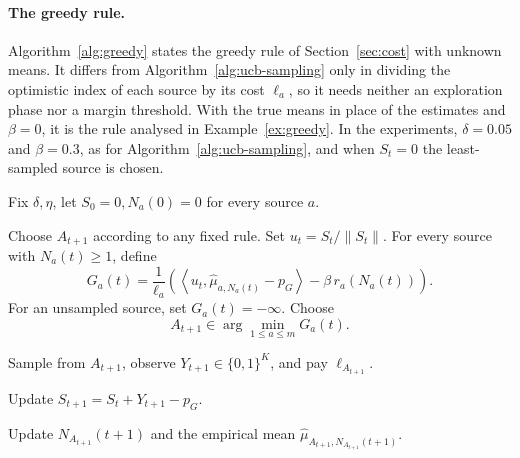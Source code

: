 \documentclass[twoside]{article}
\begin{document}
\paragraph{The greedy rule.} Algorithm~\ref{alg:greedy} states the greedy
rule of Section~\ref{sec:cost} with unknown means. It differs from
Algorithm~\ref{alg:ucb-sampling} only in dividing the optimistic index of
each source by its cost \(\ell_a\), so it needs neither an exploration phase
nor a margin threshold. With the true means in place of the estimates and
\(\beta=0\), it is the rule analysed in Example~\ref{ex:greedy}. In the
experiments, \(\delta=0.05\) and \(\beta=0.3\), as for
Algorithm~\ref{alg:ucb-sampling}, and when \(S_t=0\) the least-sampled
source is chosen.

\begin{algorithm}[!ht]
\caption{Greedy Cost-Aware Sampling}
\label{alg:greedy}
\begin{algorithmic}[1]
\STATE Fix $\delta, \eta$, let \(S_0=0, N_a(0)=0\) for every source \(a\).

        \STATE Choose \(A_{t+1}\) according to any fixed rule.
    \ELSE
        \STATE Set $u_t= S_t/\|S_t\|$.
        \STATE For every source with \(N_a(t)\ge1\), define
        \[
            G_a(t)
                =
                \frac{1}{\ell_a}
                \left(
                \left\langle
                u_t,\widehat\mu_{a,N_a(t)}-p_G
                \right\rangle
                -
                \beta\,r_a\!\left(N_a(t)\right)
                \right).
        \]
        For an unsampled source, set \(G_a(t)=-\infty\).
        \STATE Choose
        \[
            A_{t+1}
            \in
            \arg\min_{1\le a\le m} G_a(t).
        \]
    \ENDIF

    \STATE Sample from \(A_{t+1}\), observe
    \(Y_{t+1}\in\{0,1\}^K\), and pay \(\ell_{A_{t+1}}\).

    \STATE Update $S_{t+1} = S_t+Y_{t+1}-p_G$.

    \STATE Update \(N_{A_{t+1}}(t+1)\) and the empirical mean
    \(\widehat\mu_{A_{t+1},N_{A_{t+1}}(t+1)}\).

\ENDFOR
\end{algorithmic}
\end{algorithm}
\end{document}
